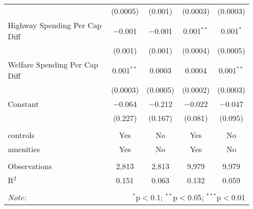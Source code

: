 \begin{table}[!htbp]
\begin{tabular}{@{\extracolsep{5pt}}lcccc}
  & (0.0005) & (0.001) & (0.0003) & (0.0003) \\ 
  Highway Spending Per Cap Diff & $-$0.001 & $-$0.001 & 0.001$^{**}$ & 0.001$^{*}$ \\ 
  & (0.001) & (0.001) & (0.0004) & (0.0005) \\ 
  Welfare Spending Per Cap Diff & 0.001$^{**}$ & 0.0003 & 0.0004 & 0.001$^{**}$ \\ 
  & (0.0003) & (0.0005) & (0.0002) & (0.0003) \\ 
  Constant & $-$0.064 & $-$0.212 & $-$0.022 & $-$0.047 \\ 
  & (0.227) & (0.167) & (0.081) & (0.095) \\ 
 \hline \\[-1.8ex] 
controls & Yes & No & Yes & No \\ 
amenities & Yes & No & Yes & No \\ 
\hline \\[-1.8ex] 
Observations & 2,813 & 2,813 & 9,979 & 9,979 \\ 
R$^{2}$ & 0.151 & 0.063 & 0.132 & 0.059 \\ 
\hline 
\hline \\[-1.8ex] 
\textit{Note:}  & \multicolumn{4}{r}{$^{*}$p$<$0.1; $^{**}$p$<$0.05; $^{***}$p$<$0.01} \\ 
\end{tabular} 
\end{table} 
